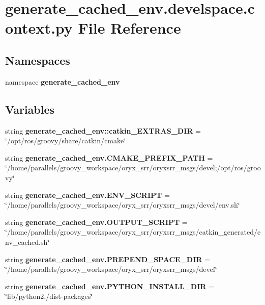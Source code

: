 \section{generate\-\_\-cached\-\_\-env.\-develspace.\-context.\-py \-File \-Reference}
\label{generate__cached__env_8develspace_8context_8py}
\subsection*{\-Namespaces}
\begin{DoxyCompactItemize}
\item 
namespace {\bf generate\-\_\-cached\-\_\-env}
\end{DoxyCompactItemize}
\subsection*{\-Variables}
\begin{DoxyCompactItemize}
\item 
string {\bf generate\-\_\-cached\-\_\-env\-::catkin\-\_\-\-E\-X\-T\-R\-A\-S\-\_\-\-D\-I\-R} = \char`\"{}/opt/ros/groovy/share/catkin/cmake\char`\"{}
\item 
string {\bf generate\-\_\-cached\-\_\-env.\-C\-M\-A\-K\-E\-\_\-\-P\-R\-E\-F\-I\-X\-\_\-\-P\-A\-T\-H} = \char`\"{}/home/parallels/groovy\-\_\-workspace/oryx\-\_\-srr/oryxsrr\-\_\-msgs/devel;/opt/ros/groovy\char`\"{}
\item 
string {\bf generate\-\_\-cached\-\_\-env.\-E\-N\-V\-\_\-\-S\-C\-R\-I\-P\-T} = \char`\"{}/home/parallels/groovy\-\_\-workspace/oryx\-\_\-srr/oryxsrr\-\_\-msgs/devel/env.\-sh\char`\"{}
\item 
string {\bf generate\-\_\-cached\-\_\-env.\-O\-U\-T\-P\-U\-T\-\_\-\-S\-C\-R\-I\-P\-T} = \char`\"{}/home/parallels/groovy\-\_\-workspace/oryx\-\_\-srr/oryxsrr\-\_\-msgs/catkin\-\_\-generated/env\-\_\-cached.\-sh\char`\"{}
\item 
string {\bf generate\-\_\-cached\-\_\-env.\-P\-R\-E\-P\-E\-N\-D\-\_\-\-S\-P\-A\-C\-E\-\_\-\-D\-I\-R} = \char`\"{}/home/parallels/groovy\-\_\-workspace/oryx\-\_\-srr/oryxsrr\-\_\-msgs/devel\char`\"{}
\item 
string {\bf generate\-\_\-cached\-\_\-env.\-P\-Y\-T\-H\-O\-N\-\_\-\-I\-N\-S\-T\-A\-L\-L\-\_\-\-D\-I\-R} = \char`\"{}lib/python2./dist-\/packages\char`\"{}
\end{DoxyCompactItemize}
